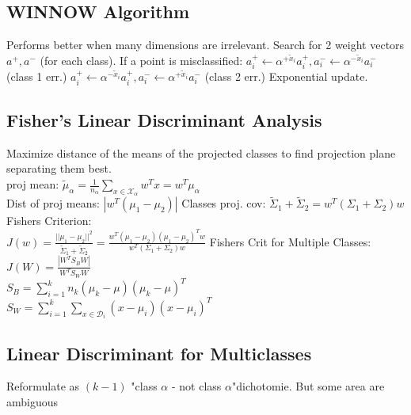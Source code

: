 \subsection*{WINNOW Algorithm}
Performs better when many dimensions are irrelevant. Search for 2 weight vectors $a^+, a^-$ (for each class). If a point is misclassified:
$a_i^+ {\leftarrow} \alpha^{+\tilde{x}_i}a_i^+, a_i^- {\leftarrow} \alpha^{-\tilde{x}_i}a_i^-$ (class 1 err.)
$a_i^+ {\leftarrow} \alpha^{-\tilde{x}_i}a_i^+, a_i^- {\leftarrow} \alpha^{+\tilde{x}_i}a_i^-$ (class 2 err.)
Exponential update.

\subsection*{Fisher's Linear Discriminant Analysis}
Maximize distance of the means of the projected classes to find projection plane separating them best.\\
proj mean: $\tilde{\mu}_{\alpha}{=}\frac{1}{n_{\alpha}}\sum_{x\in\mathcal{X}_{\alpha}}w^Tx{=}w^T\mu_{\alpha}$\\
Dist of proj means: $|w^T(\mu_1-\mu_2)|$
Classes proj. cov: $\tilde{\Sigma}_1{+}\tilde{\Sigma}_2{=}w^T(\Sigma_1{+}\Sigma_2)w$\\
Fishers Criterion:\\
$J(w)=\frac{||\mu_1-\mu_2||^2}{\tilde{\Sigma}_1{+}\tilde{\Sigma}_2}=\frac{w^T(\mu_1-\mu_2)(\mu_1-\mu_2)^Tw}{w^T(\Sigma_1{+}\Sigma_2)w}$
Fishers Crit for Multiple Classes:\\
$J(W)=\frac{|W^TS_BW|}{W^TS_WW}$\\
$S_B=\sum_{i=1}^kn_k(\mu_k-\mu)(\mu_k-\mu)^T$\\
$S_W=\sum_{i=1}^k\sum_{x\in \mathcal{D}_i}(x-\mu_i)(x-\mu_i)^T$

\subsection*{Linear Discriminant for Multiclasses}
Reformulate as $(k-1)$ "class $\alpha$ - not class $\alpha$"dichotomie.
But some area are ambiguous

